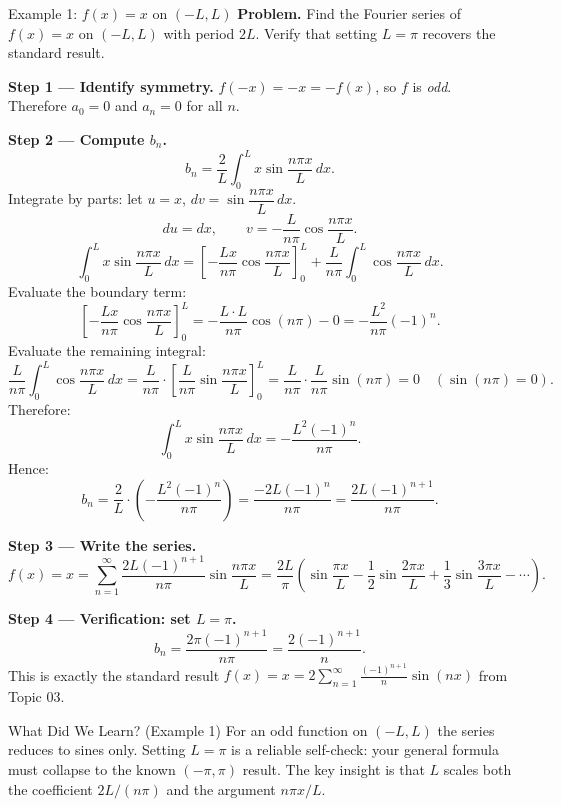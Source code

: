 \documentclass[12pt,a4paper]{article}
\begin{document}
\begin{infobox}{Example 1: $f(x) = x$ on $(-L, L)$}
\textbf{Problem.} Find the Fourier series of $f(x) = x$ on $(-L, L)$ with period $2L$.
Verify that setting $L = \pi$ recovers the standard result.

\medskip
\textbf{Step 1 --- Identify symmetry.}
$f(-x) = -x = -f(x)$, so $f$ is \emph{odd}.
Therefore $a_0 = 0$ and $a_n = 0$ for all $n$.

\textbf{Step 2 --- Compute $b_n$.}
\[
b_n = \frac{2}{L}\int_0^L x\sin\frac{n\pi x}{L}\,dx.
\]
Integrate by parts: let $u = x$, $dv = \sin\dfrac{n\pi x}{L}\,dx$.
\[
du = dx, \qquad v = -\frac{L}{n\pi}\cos\frac{n\pi x}{L}.
\]
\[
\int_0^L x\sin\frac{n\pi x}{L}\,dx
= \left[-\frac{Lx}{n\pi}\cos\frac{n\pi x}{L}\right]_0^L
  + \frac{L}{n\pi}\int_0^L \cos\frac{n\pi x}{L}\,dx.
\]
Evaluate the boundary term:
\[
\left[-\frac{Lx}{n\pi}\cos\frac{n\pi x}{L}\right]_0^L
= -\frac{L\cdot L}{n\pi}\cos(n\pi) - 0
= -\frac{L^2}{n\pi}(-1)^n.
\]
Evaluate the remaining integral:
\[
\frac{L}{n\pi}\int_0^L \cos\frac{n\pi x}{L}\,dx
= \frac{L}{n\pi}\cdot\left[\frac{L}{n\pi}\sin\frac{n\pi x}{L}\right]_0^L
= \frac{L}{n\pi}\cdot\frac{L}{n\pi}\sin(n\pi)
= 0 \quad (\sin(n\pi) = 0).
\]
Therefore:
\[
\int_0^L x\sin\frac{n\pi x}{L}\,dx = -\frac{L^2(-1)^n}{n\pi}.
\]
Hence:
\[
b_n = \frac{2}{L}\cdot\left(-\frac{L^2(-1)^n}{n\pi}\right)
= \frac{-2L(-1)^n}{n\pi}
= \frac{2L(-1)^{n+1}}{n\pi}.
\]

\textbf{Step 3 --- Write the series.}
\[
f(x) = x = \sum_{n=1}^{\infty} \frac{2L(-1)^{n+1}}{n\pi}\sin\frac{n\pi x}{L}
= \frac{2L}{\pi}\left(\sin\frac{\pi x}{L} - \frac{1}{2}\sin\frac{2\pi x}{L}
  + \frac{1}{3}\sin\frac{3\pi x}{L} - \cdots\right).
\]

\textbf{Step 4 --- Verification: set $L = \pi$.}
\[
b_n = \frac{2\pi(-1)^{n+1}}{n\pi} = \frac{2(-1)^{n+1}}{n}.
\]
This is exactly the standard result $f(x) = x = 2\sum_{n=1}^{\infty}\frac{(-1)^{n+1}}{n}\sin(nx)$
from Topic 03. \checkmark
\end{infobox}

\begin{learnbox}{What Did We Learn? (Example 1)}
For an odd function on $(-L,L)$ the series reduces to sines only.
Setting $L = \pi$ is a reliable self-check: your general formula must collapse to the known $(-\pi,\pi)$ result.
The key insight is that $L$ scales both the coefficient $2L/(n\pi)$ and the argument $n\pi x/L$.
\end{learnbox}
\end{document}
